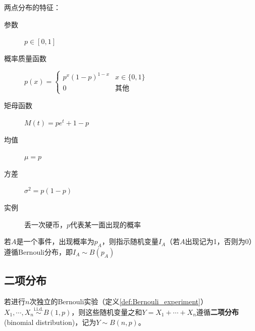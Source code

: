 两点分布的特征：
\begin{description}
    \item[参数] $p \in [0,1]$
    \item[概率质量函数] $p(x)=\begin{cases}
                p^x (1-p)^{1-x} & x \in \{0,1 \} \\
                0               & \text{其他}
            \end{cases}$
    \item[矩母函数] $M(t)=p e^t + 1-p$
    \item[均值] $\mu=p$
    \item[方差] $\sigma^2=p(1-p)$
    \item[实例] 丢一次硬币，$p$代表某一面出现的概率
\end{description}

\begin{remark}
    若$A$是一个事件，出现概率为$p_A$，则指示随机变量$I_A$（若$A$出现记为1，否则为0）遵循Bernouli分布，即$I_A \sim B(p_A)$
\end{remark}

\subsection{二项分布}

\begin{definition}[二项分布]\label{def:binom_dist}
    若进行$n$次独立的Bernouli实验（定义\ref{def:Bernouli_experiment}）$X_1,\cdots,X_n \overset{\text{i.i.d.}}{\sim} B(1,p)$，则这些随机变量之和$Y=X_1+\cdots+X_n$遵循\textbf{二项分布}(binomial distribution)，记为$Y \sim B(n,p)$。
\end{definition}

